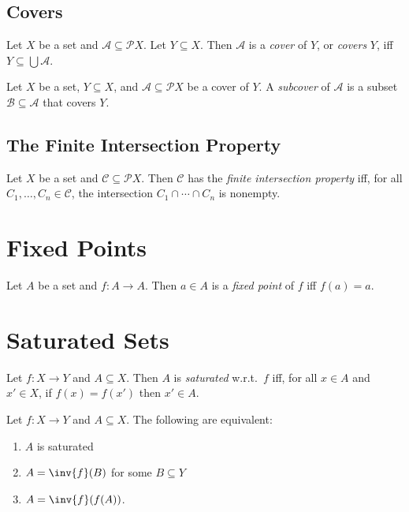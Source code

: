 \subsection{Covers}

\begin{df}[Cover]
  Let $X$ be a set and $\mathcal{A} \subseteq \mathcal{P} X$. Let $Y \subseteq X$. Then $\mathcal{A}$ is a \emph{cover} of $Y$, or \emph{covers} $Y$, iff $Y \subseteq \bigcup \mathcal{A}$.
\end{df}

\begin{df}[Subcover]
  Let $X$ be a set, $Y \subseteq X$, and $\mathcal{A} \subseteq \mathcal{P} X$ be a cover of $Y$. A \emph{subcover} of $\mathcal{A}$ is a subset $\mathcal{B} \subseteq \mathcal{A}$ that covers $Y$.
\end{df}

\subsection{The Finite Intersection Property}

\begin{df}
  Let $X$ be a set and $\mathcal{C} \subseteq \mathcal{P} X$. Then $\mathcal{C}$ has the \emph{finite intersection property} iff, for all $C_1, \ldots, C_n \in \mathcal{C}$, the intersection $C_1 \cap \cdots \cap C_n$ is nonempty.
\end{df}

\section{Fixed Points}

\begin{df}
  Let $A$ be a set and $f : A \rightarrow A$. Then $a \in A$ is a \emph{fixed point} of $f$ iff $f(a) = a$.
\end{df}

\section{Saturated Sets}

\begin{df}
  Let $f : X \rightarrow Y$ and $A \subseteq X$. Then $A$ is \emph{saturated} w.r.t.~$f$ iff, for all $x \in A$ and $x' \in X$, if $f(x) = f(x')$ then $x' \in A$.
\end{df}

\begin{prop}
  Let $f : X \rightarrow Y$ and $A \subseteq X$. The following are equivalent:
  \begin{enumerate}
    \item $A$ is saturated
    \item $A = \inv{f}(B)$ for some $B \subseteq Y$
    \item $A = \inv{f}(f(A))$.
  \end{enumerate}
\end{prop}


